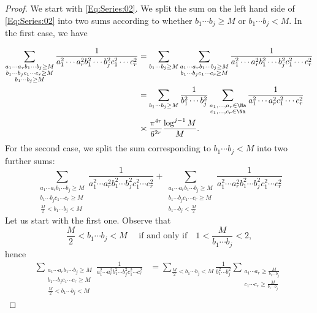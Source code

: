 \documentclass[12pt,a4paper]{amsart}
\begin{document}
\begin{proof}
We start with \eqref{Eq:Series:02}. We split the sum on the left hand side of \eqref{Eq:Series:02} into two sums according to whether $b_1\cdots b_j\geq M$ or $b_1\cdots b_j< M$. In the first case, we have

\begin{align*}
\sum_{\substack{a_1 \cdots a_r b_1\cdots b_j\geq M \\ b_1\cdots b_j c_1 \cdots c_r\geq M \\b_1\cdots b_j\geq M }} \frac{1}{a_1^2\cdots a_r^2 b_1^2\cdots b_j^2 c_1^2 \cdots c_r^2}
&=
\sum_{ b_1\cdots b_j\geq M } 
\sum_{\substack{a_1 \cdots a_r b_1\cdots b_j\geq M \\ b_1\cdots b_j c_1 \cdots c_r\geq M  }} 
\frac{1}{a_1^2\cdots a_r^2 b_1^2\cdots b_j^2 c_1^2 \cdots c_r^2} \nonumber\\
&=
\sum_{ b_1\cdots b_j\geq M } 
\frac{1}{b_1^2\cdots b_j^2}
\sum_{\substack{a_1, \ldots, a_r\in\Na \\ c_1, \ldots, c_r\in\Na  }} 
\frac{1}{a_1^2\cdots a_r^2  c_1^2 \cdots c_r^2} \nonumber\\
&
\asymp \frac{\pi^{4r}}{6^{2r}}\frac{\log^{j-1}M}{M}.
\end{align*}
For the second case, we split the sum corresponding to $b_1\cdots b_j< M$ into two further sums:
\[
\sum_{\substack{a_1 \cdots a_r b_1\cdots b_j\geq M \\ b_1\cdots b_j c_1 \cdots c_r\geq M \\ \frac{M}{2}< b_1\cdots b_j< M }} \frac{1}{a_1^2\cdots a_r^2 b_1^2\cdots b_j^2 c_1^2 \cdots c_r^2}
+
\sum_{\substack{a_1 \cdots a_r b_1\cdots b_j\geq M \\ b_1\cdots b_j c_1 \cdots c_r\geq M \\ b_1\cdots b_j< \frac{M}{2} }} \frac{1}{a_1^2\cdots a_r^2 b_1^2\cdots b_j^2 c_1^2 \cdots c_r^2}
\]
Let us start with the first one. Observe that 
\[
 \frac{M}{2}< b_1\cdots b_j< M 
\quad\text{ if and only if}\quad
1< \frac{M}{b_1\cdots b_j} < 2,
\]
hence
\begin{align*}
\sum_{\substack{a_1 \cdots a_r b_1\cdots b_j\geq M \\ b_1\cdots b_j c_1 \cdots c_r\geq M \\ \frac{M}{2}< b_1\cdots b_j< M }} 
\frac{1}{a_1^2\cdots a_r^2 b_1^2\cdots b_j^2 c_1^2 \cdots c_r^2}
&=
\sum_{ \frac{M}{2}< b_1\cdots b_j< M } 
\frac{1}{b_1^2\cdots b_j^2}
\sum_{\substack{a_1 \cdots a_r\geq \frac{M}{b_1\cdots b_j} \\  c_1 \cdots c_r\geq \frac{M}{b_1\cdots b_j} }} 

\end{align*}
\end{proof}
\end{document}

